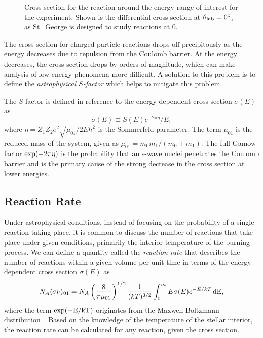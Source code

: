 \begin{figure}[t]
    \begin{center}
        \label{fig:alpa-cross-section}
        \caption[Cross section for the \alpa{} reaction]{Cross section for the
            \alpa{} reaction around the energy range of interest for the
            experiment. Shown is the differential cross section at
            $\theta_{\rm{lab}} = 0\degree$, as St.\ George is designed to study
            reactions at 0\degree.}
    \end{center}
\end{figure}

The cross section for charged particle reactions drops off precipitously as
the energy decreases due to repulsion from the Coulomb barrier. At the energy
decreases, the cross section drops by orders of magnitude, which can make
analysis of low energy phenomena more difficult. A solution to this problem is
to define the \emph{astrophysical $S$-factor} which helps to mitigate this
problem.


The $S$-factor is defined in reference to the energy-dependent cross section
$\sigma(E)$ as
\[
    \sigma(E) \equiv S(E)e^{-2\pi\eta} / E,
\]
where $\eta = Z_1Z_2e^2\sqrt{\mu_{01} / 2E\hbar^2}$ is the Sommerfeld
parameter. The term $\mu_{01}$ is the reduced mass of the system, given as
$\mu_{01} = m_0m_1/(m_0 + m_1)$. The full Gamow factor $\rm{exp}(-2\pi\eta)$ is
the probability that an s-wave nuclei penetrates the Coulomb barrier and is the
primary cause of the strong decrease in the cross section at lower energies.

\subsection{Reaction Rate}

Under astrophysical conditions, instead of focusing on the probability of a
single reaction taking place, it is common to discuss the number of reactions
that take place under given conditions, primarily the interior temperature of
the burning process. We can define a quantity called the \emph{reaction rate}
that describes the number of reactions within a given volume per unit time in
terms of the energy-dependent cross section $\sigma(E)$ as
\begin{equation}
\label{eq:reaction-rate}
    N_A\langle\sigma\nu\rangle_{01} = N_A\left(\frac{8}{\pi\mu_{01}}\right)^{1/2}
        \frac{1}{(kT)^{3/2}}\int_0^{\infty} E\sigma(E)e^{-E/kT}\,\rm{d}E,
\end{equation}
where the term $\rm{exp}(-E/kT)$ originates from the Maxwell-Boltzmann
distribution~\cite{Iliadis}. Based on the knowledge of the temperature of the
stellar interior, the reaction rate can be calculated for any reaction, given
the cross section.

